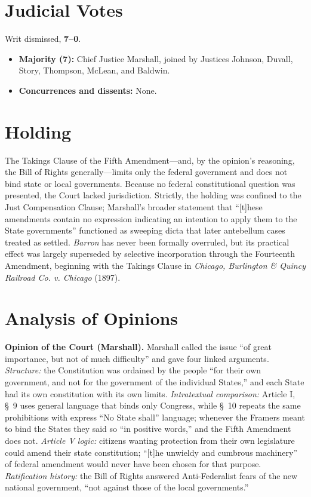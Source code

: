 \documentclass[12pt]{article}
\begin{document}
\section{Judicial Votes}

Writ dismissed, \textbf{7--0}.
\begin{itemize}
\item \textbf{Majority (7):} Chief Justice Marshall, joined by Justices Johnson, Duvall, Story, Thompson, McLean, and Baldwin.
\item \textbf{Concurrences and dissents:} None.
\end{itemize}

\section{Holding}

The Takings Clause of the Fifth Amendment---and, by the opinion's reasoning, the Bill of Rights generally---limits only the federal government and does not bind state or local governments. Because no federal constitutional question was presented, the Court lacked jurisdiction. Strictly, the holding was confined to the Just Compensation Clause; Marshall's broader statement that ``[t]hese amendments contain no expression indicating an intention to apply them to the State governments'' functioned as sweeping dicta that later antebellum cases treated as settled. \textit{Barron} has never been formally overruled, but its practical effect was largely superseded by selective incorporation through the Fourteenth Amendment, beginning with the Takings Clause in \textit{Chicago, Burlington \& Quincy Railroad Co. v. Chicago} (1897).

\section{Analysis of Opinions}

\textbf{Opinion of the Court (Marshall).} Marshall called the issue ``of great importance, but not of much difficulty'' and gave four linked arguments. \emph{Structure:} the Constitution was ordained by the people ``for their own government, and not for the government of the individual States,'' and each State had its own constitution with its own limits. \emph{Intratextual comparison:} Article I, \S~9 uses general language that binds only Congress, while \S~10 repeats the same prohibitions with express ``No State shall'' language; whenever the Framers meant to bind the States they said so ``in positive words,'' and the Fifth Amendment does not. \emph{Article V logic:} citizens wanting protection from their own legislature could amend their state constitution; ``[t]he unwieldy and cumbrous machinery'' of federal amendment would never have been chosen for that purpose. \emph{Ratification history:} the Bill of Rights answered Anti-Federalist fears of the new national government, ``not against those of the local governments.''
\end{document}
